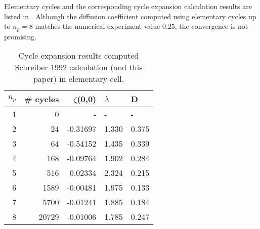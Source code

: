 

Elementary cycles and the corresponding cycle expansion calculation
results are listed in . Although the diffusion
coefficient computed using elementary cycles up to $n_p = 8$ matches
the numerical experiment value $0.25$, the convergence is not
promising.

\begin{table}[htbp]
\begin{tabular}{|r|r|r|l|l|}
\hline
${n_p}$ & \# cycles & $\zeta$(0,0) & $\lambda$ & D \\ \hline\hline
1      & 0      &   -    &   -  &   - \\
2      & 24     & -0.31697 & 1.330 & 0.375\\
3      & 64     & -0.54152 & 1.435 & 0.339\\
4      & 168    & -0.09764 & 1.902 & 0.284\\
5      & 516    &  0.02334 & 2.324 & 0.215\\
6      & 1589   & -0.00481 & 1.975 & 0.133\\
7      & 5700   & -0.01241 & 1.885 & 0.184\\
8      & 20729  & -0.01006 & 1.785 & 0.247\\ \hline

\end{tabular}
\caption{\label{TCELL1}
Cycle expansion results computed Schreiber 1992 calculation (and
  this paper) in elementary cell.
}
\end{table}

